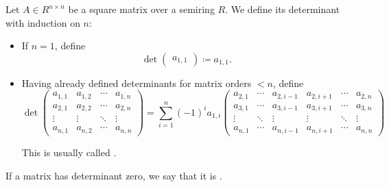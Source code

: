 \begin{definition}\label{def:matrix_determinant}
  Let \( A \in R^{n \times n} \) be a square matrix over a semiring \( R \). We define its determinant with induction on \( n \):
  \begin{itemize}
    \item If \( n = 1 \), define
    \begin{equation*}
      \det \begin{pmatrix} a_{1,1} \end{pmatrix} \coloneqq a_{1,1}.
    \end{equation*}

    \item Having already defined determinants for matrix orders \( < n \), define
    \begin{equation*}
      \det \begin{pmatrix}
        a_{1,1} & a_{1,2} & \cdots & a_{1,n} \\
        a_{2,1} & a_{2,2} & \cdots & a_{2,n} \\
        \vdots  & \vdots  & \ddots & \vdots \\
        a_{n,1} & a_{n,2} & \cdots & a_{n,n}
      \end{pmatrix}
      =
      \sum_{i=1}^n (-1)^i a_{1,i} \begin{pmatrix}
        a_{2,1} & \cdots & a_{2, i - 1} & a_{2, i + 1} & \cdots & a_{2,n} \\
        a_{3,1} & \cdots & a_{3, i - 1} & a_{3, i + 1} & \cdots & a_{3,n} \\
        \vdots  & \ddots & \vdots       & \vdots       & \ddots & \vdots \\
        a_{n,1} & \cdots & a_{n, i - 1} & a_{n, i + 1} & \cdots & a_{n,n}
      \end{pmatrix}
    \end{equation*}

    This is usually called .
  \end{itemize}

  If a matrix has determinant zero, we say that it is .
\end{definition}

